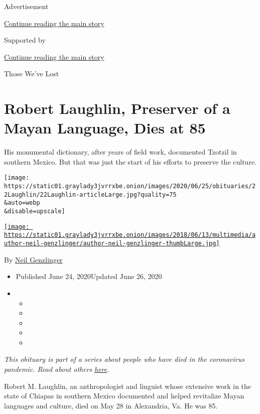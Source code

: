 Advertisement

\protect\hyperlink{after-top}{Continue reading the main story}

Supported by

\protect\hyperlink{after-sponsor}{Continue reading the main story}

Those We've Lost

\hypertarget{robert-laughlin-preserver-of-a-mayan-language-dies-at-85}{%
\section{Robert Laughlin, Preserver of a Mayan Language, Dies at
85}\label{robert-laughlin-preserver-of-a-mayan-language-dies-at-85}}

His monumental dictionary, after years of field work, documented Tzotzil
in southern Mexico. But that was just the start of his efforts to
preserve the culture.

\texttt{[image: https://static01.graylady3jvrrxbe.onion/images/2020/06/25/obituaries/22Laughlin/22Laughlin-articleLarge.jpg?quality=75\\\&auto=webp\\\&disable=upscale]}

\href{https://www.nytimes3xbfgragh.onion/by/neil-genzlinger}{\texttt{[image: https://static01.graylady3jvrrxbe.onion/images/2018/06/13/multimedia/author-neil-genzlinger/author-neil-genzlinger-thumbLarge.jpg]}}

By \href{https://www.nytimes3xbfgragh.onion/by/neil-genzlinger}{Neil
Genzlinger}

\begin{itemize}
\item
  Published June 24, 2020Updated June 26, 2020
\item
  \begin{itemize}
  \item
  \item
  \item
  \item
  \item
  \end{itemize}
\end{itemize}

\emph{This obituary is part of a series about people who have died in
the coronavirus pandemic. Read about others}
\href{https://www.nytimes3xbfgragh.onion/interactive/2020/obituaries/people-died-coronavirus-obituaries.html}{\emph{here}}\emph{.}

Robert M. Laughlin, an anthropologist and linguist whose extensive work
in the state of Chiapas in southern Mexico documented and helped
revitalize Mayan languages and culture, died on May 28 in Alexandria,
Va. He was 85.

